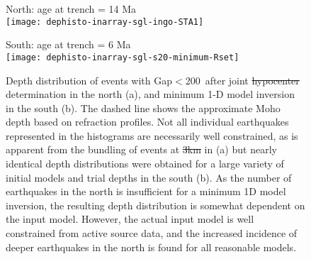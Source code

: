 \documentclass[reviewcopy]{elsart}
\renewcommand{\includegraphics}[2][]{\fbox{#2}}
\providecommand{\DIFadd}[1]{{\protect\color{blue}\uwave{#1}}} %
\providecommand{\DIFdel}[1]{{\protect\color{red}\sout{#1}}}                      %
\providecommand{\DIFaddFL}[1]{\DIFadd{#1}} %
\providecommand{\DIFdelFL}[1]{\DIFdel{#1}} %
\providecommand{\DIFaddbeginFL}{} %
\providecommand{\DIFaddendFL}{} %
\providecommand{\DIFdelbeginFL}{} %
\providecommand{\DIFdelendFL}{} %
\begin{document}
\begin{figure}

\DIFdelbeginFL %
\DIFdelendFL \DIFaddbeginFL \begin{minipage}[t]{0.4\textwidth}
\DIFaddendFL { North: age at trench = 14 Ma} \\
\texttt{[image: dephisto-inarray-sgl-ingo-STA1]}
\end{minipage}\hfill%
\DIFdelbeginFL %
\DIFdelendFL \DIFaddbeginFL \begin{minipage}[t]{0.4\textwidth}
\DIFaddendFL { South: age at trench = 6 Ma} \\
\texttt{[image: dephisto-inarray-sgl-s20-minimum-Rset]}
\end{minipage}


\caption{Depth distribution of events with
  Gap$<$200\dg\DIFaddbeginFL \ \DIFaddendFL after  joint
  \DIFdelbeginFL \DIFdelFL{hypocenter }\DIFdelendFL \DIFaddbeginFL \DIFaddFL{hypocentre }\DIFaddendFL determination in the north (a), and minimum 1-D model
inversion in the south (b). The
  dashed line shows the approximate Moho depth based on refraction
profiles. 
Not all individual earthquakes represented in the
  histograms are necessarily well constrained, as is apparent from the
  bundling of events at \DIFdelbeginFL \DIFdelFL{3km }\DIFdelendFL \DIFaddbeginFL \DIFaddFL{3~km }\DIFaddendFL in (a) but nearly identical depth distributions were
  obtained for a large variety of initial models and trial depths in
  the south
  (b).  As the number of earthquakes in the north is insufficient for
  a minimum 1D model inversion, the resulting depth distribution is
  somewhat dependent on the input model.  However, the actual input model
  is well constrained from active source data, and the increased
  incidence of deeper earthquakes in the north is found for all
  reasonable models. 
} 
\label{fig:dephistos}
\end{figure}
\end{document}
